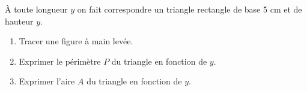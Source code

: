 \documentclass[exercice]{thedocument}%
\begin{document}
%
À toute longueur $y$ on fait correspondre un triangle rectangle de base 5 cm et de hauteur $y$.
\begin{enumerate}
  \item Tracer une figure à main levée.
  \item Exprimer le périmètre $P$ du triangle en fonction de $y$.
  \item Exprimer l'aire $A$ du triangle en fonction de $y$.
\end{enumerate}
\end{document}
